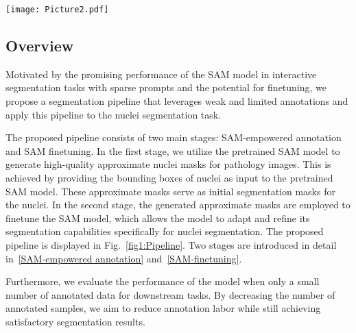 \documentclass[conference]{IEEEtran}
\begin{document}
\begin{figure*}[t]
\begin{center}
\texttt{[image: Picture2.pdf]}
\end{center}
   \caption{The proposed pipeline using weak and few annotations for nuclei segmentation. In the training stage, only the bounding boxes (in green color) of nuclei were provided as the weak annotation label to generate the approximate segmentation masks. Then, with the supervision of the approximate segmentation masks, the prompt-based finetuning was applied to the pretrained SAM model. In the inference stage, nuclei can be segmented directly from images without box prompts.}
\label{fig1:Pipeline}
\end{figure*}

\subsection{Overview} \label{Overview}
Motivated by the promising performance of the SAM model in interactive segmentation tasks with sparse prompts and the potential for finetuning, we propose a segmentation pipeline that leverages weak and limited annotations and apply this pipeline to the nuclei segmentation task.

The proposed pipeline consists of two main stages: SAM-empowered annotation and SAM finetuning. In the first stage, we utilize the pretrained SAM model to generate high-quality approximate nuclei masks for pathology images. This is achieved by providing the bounding boxes of nuclei as input to the pretrained SAM model. These approximate masks serve as initial segmentation masks for the nuclei. In the second stage, the generated approximate masks are employed to finetune the SAM model, which allows the model to adapt and refine its segmentation capabilities specifically for nuclei segmentation. The proposed pipeline is displayed in Fig.~\ref{fig1:Pipeline}. Two stages are introduced in detail in~\ref{SAM-empowered annotation} and~\ref{SAM-finetuning}.

Furthermore, we evaluate the performance of the model when only a small number of annotated data for downstream tasks. By decreasing the number of annotated samples, we aim to reduce annotation labor while still achieving satisfactory segmentation results.
\end{document}

